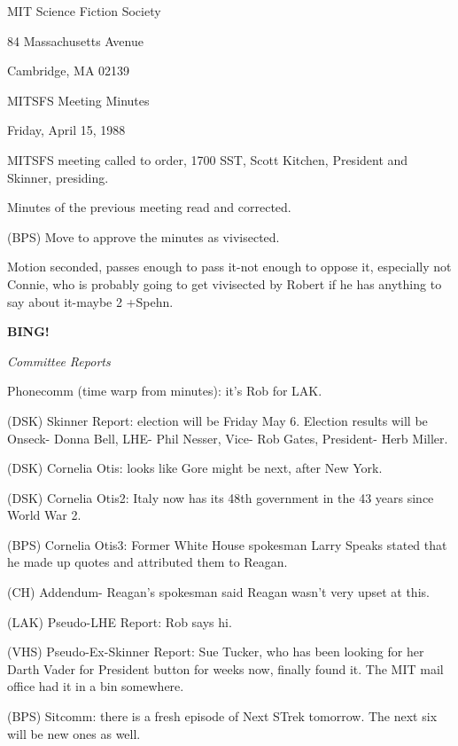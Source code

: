 \documentclass[12pt]{article}
\newcommand{\bing}{{\bf BING!} }
\newcommand{\goto}[1]{\bing \vskip 12pt \centerline{{\em{#1}}}}
\begin{document}
\begin{center}

MIT Science Fiction Society 

84 Massachusetts Avenue

Cambridge, MA 02139

\vspace{12pt}

MITSFS Meeting Minutes 

Friday, April 15, 1988

\end{center}
 
\vspace{18pt}

\setlength{\parskip}{6pt}

\noindent
MITSFS meeting called to order, 1700 SST,
Scott Kitchen, President and Skinner, presiding.

Minutes of the previous meeting read and corrected.

(BPS) Move to approve the minutes as vivisected.

Motion seconded, passes enough to pass it-not enough to oppose it, especially not Connie, who is probably going to get vivisected by Robert if he has anything to say about it-maybe 2 +Spehn.

\goto{Committee Reports}

Phonecomm (time warp from minutes): it's Rob for LAK.

(DSK) Skinner Report: election will be Friday May 6. Election results will be Onseck- Donna Bell, LHE- Phil Nesser, Vice- Rob Gates, President- Herb Miller.

(DSK) Cornelia Otis: looks like Gore might be next, after New York.

(DSK) Cornelia Otis2: Italy now has its 48th government in the 43 years since World War 2.

(BPS) Cornelia Otis3: Former White House spokesman Larry Speaks stated that he made up quotes and attributed them to Reagan.

(CH) Addendum- Reagan's spokesman said Reagan wasn't very upset at this.

(LAK) Pseudo-LHE Report: Rob says hi.

(VHS) Pseudo-Ex-Skinner Report: Sue Tucker, who has been looking for her Darth Vader for President button for weeks now, finally found it. The MIT mail office had it in a bin somewhere.

(BPS) Sitcomm: there is a fresh episode of Next STrek tomorrow. The next six will be new ones as well.
\end{document}
